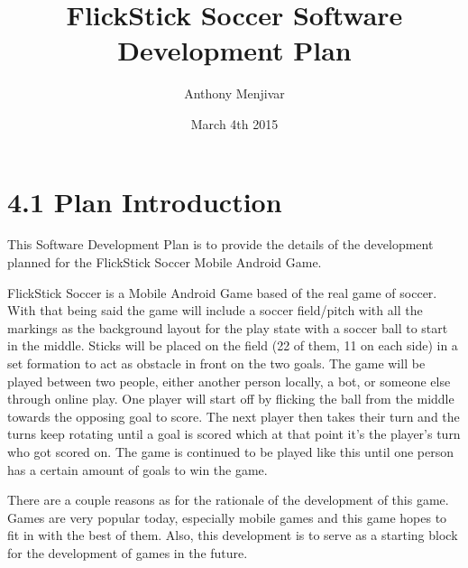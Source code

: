 \documentclass{article}
\title{FlickStick Soccer Software Development Plan}
\author{Anthony Menjivar}
\date{March 4th 2015}
\begin{document}
\maketitle

\section{4.1 Plan Introduction}
This Software Development Plan is to provide the details of the development planned for the FlickStick Soccer Mobile Android Game. 

FlickStick Soccer is a Mobile Android Game based of the real game of soccer. With that being said the game will include a soccer field/pitch with all the markings as the background layout for the play state with a soccer ball to start in the middle. Sticks will be placed on the field (22 of them, 11 on each side) in a set formation to act as obstacle in front on the  two goals. The game will be played between two people, either another person locally, a bot, or someone else through online play. One player will start off by flicking the ball from the middle towards the opposing goal to score. The next player then takes their turn and the turns keep rotating until a goal is scored which at that point it's the player's turn who got scored on. The game is continued to be played like this until one person has a certain amount of goals to win the game.

There are a couple reasons as for the rationale of the development of this game. Games are very popular today, especially mobile games and this game hopes to fit in with the best of them. Also, this development is to serve as a starting block for the development of games in the future.
\vspace{2mm}
\end{document}
